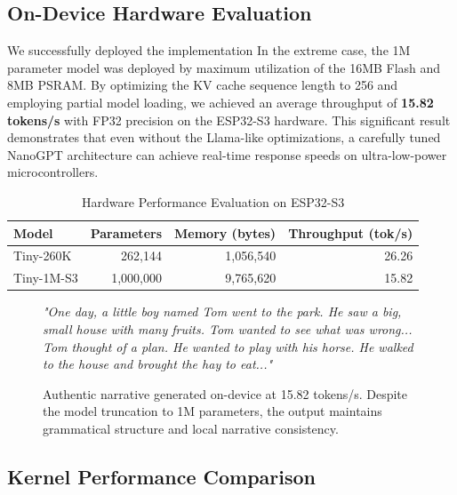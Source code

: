 \subsection{On-Device Hardware Evaluation}

We successfully deployed the \tinybit{} implementation    In the extreme case, the 1M parameter model was deployed by maximum utilization of the 16MB Flash and 8MB PSRAM. By optimizing the KV cache sequence length to 256 and employing partial model loading, we achieved an average throughput of \textbf{15.82 tokens/s} with FP32 precision on the ESP32-S3 hardware. This significant result demonstrates that even without the Llama-like optimizations, a carefully tuned NanoGPT architecture can achieve real-time response speeds on ultra-low-power microcontrollers.

    \begin{table}[h]
    \centering
    \caption{Hardware Performance Evaluation on ESP32-S3}
    \begin{tabular}{lrrr}
    \toprule
    Model & Parameters & Memory (bytes) & Throughput (tok/s) \\
    \midrule
    Tiny-260K & 262,144 & 1,056,540 & 26.26 \\
    Tiny-1M-S3 & 1,000,000 & 9,765,620 & 15.82 \\
    \bottomrule
    \end{tabular}
    \end{table}

\begin{figure}[htbp]
\centering
\begin{tcolorbox}[colback=white,colframe=black!70,title=\textbf{Live Hardware Inference: GPT-2-1M on ESP32-S3},arc=2mm,outer arc=3mm]
\small
\textit{"One day, a little boy named Tom went to the park. He saw a big, small house with many fruits. Tom wanted to see what was wrong... Tom thought of a plan. He wanted to play with his horse. He walked to the house and brought the hay to eat..."}
\end{tcolorbox}
\caption{Authentic narrative generated on-device at 15.82 tokens/s. Despite the model truncation to 1M parameters, the output maintains grammatical structure and local narrative consistency.}
\label{fig:generated_text}
\end{figure}

\subsection{Kernel Performance Comparison}

